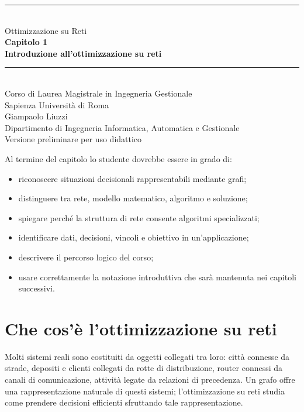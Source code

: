 \documentclass[11pt,a4paper]{article}
\begin{document}
\hypersetup{pageanchor=false}
\begin{titlepage}
\centering
\vspace*{1.6cm}
{\color{sapienzared}\rule{\textwidth}{1.2pt}}\\[1.1cm]
{\Large Ottimizzazione su Reti}\\[0.35cm]
{\huge\bfseries Capitolo 1}\\[0.45cm]
{\LARGE\bfseries Introduzione all'ottimizzazione su reti}\\[1.1cm]
{\color{sapienzared}\rule{0.72\textwidth}{0.8pt}}\\[1.1cm]
{\large Corso di Laurea Magistrale in Ingegneria Gestionale}\\[0.25cm]
{\large Sapienza Università di Roma}\\[1.2cm]
{\large Giampaolo Liuzzi}\\[0.25cm]
{\normalsize Dipartimento di Ingegneria Informatica, Automatica e Gestionale}\\[2cm]
\vfill
{\small Versione preliminare per uso didattico}
\end{titlepage}

\hypersetup{pageanchor=true}
\tableofcontents
\newpage
{}

\begin{learningbox}
Al termine del capitolo lo studente dovrebbe essere in grado di:
\begin{itemize}[nosep]
\item riconoscere situazioni decisionali rappresentabili mediante grafi;
\item distinguere tra rete, modello matematico, algoritmo e soluzione;
\item spiegare perché la struttura di rete consente algoritmi specializzati;
\item identificare dati, decisioni, vincoli e obiettivo in un'applicazione;
\item descrivere il percorso logico del corso;
\item usare correttamente la notazione introduttiva che sarà mantenuta nei capitoli successivi.
\end{itemize}
\end{learningbox}

\section{Che cos'è l'ottimizzazione su reti}

Molti sistemi reali sono costituiti da oggetti collegati tra loro: città connesse da strade, depositi e clienti collegati da rotte di distribuzione, router connessi da canali di comunicazione, attività legate da relazioni di precedenza. Un grafo offre una rappresentazione naturale di questi sistemi; l'ottimizzazione su reti studia come prendere decisioni efficienti sfruttando tale rappresentazione.
\end{document}
